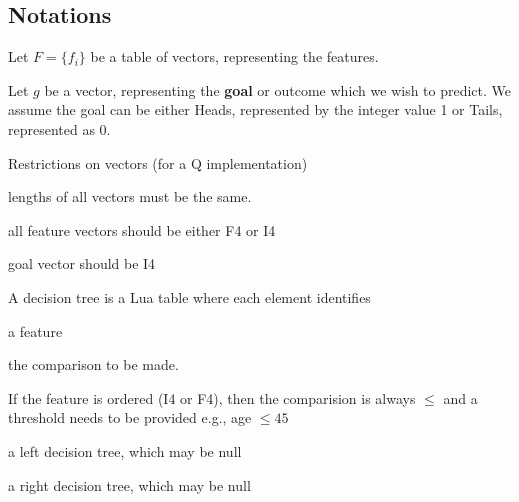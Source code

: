 \subsection{Notations}

\bi
\item Let \(F = \{f_i\}\) be a table of vectors, representing the features.
\item Let \(g\) be a vector, representing the {\bf goal} or 
outcome which we wish to
predict. We assume the goal can be either Heads, represented by the integer value 1 or Tails, represented as 0.
\item Restrictions on vectors (for a Q implementation)
\be
\item lengths of all vectors must be the same. 
\item all feature vectors should be either F4 or I4 
\item goal vector should be I4
\ee
\ei

A decision tree is a Lua table where each element identifies
\be
\item a feature
\item the comparison to be made. 
\be 
\item If the feature is ordered (I4 or F4), then the
comparision is always \(\leq\) and a threshold needs to be provided e.g., age
\(\leq 45\) 
\ee
\item a left decision tree, which may be null
\item a right decision tree, which may be null
\ee


